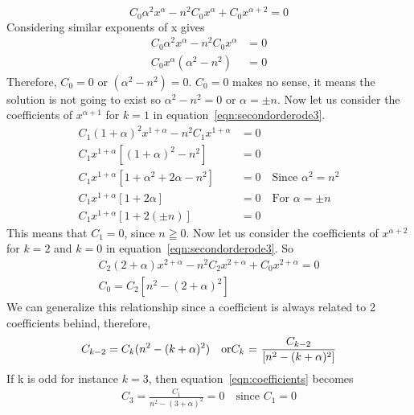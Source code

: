 \[
C_0 \alpha^2 x^\alpha - n^2C_0 x^\alpha + C_0 x^{\alpha + 2} =0
\]
Considering similar exponents of x gives 
\begin{align*}
C_0 \alpha^2 x^\alpha - n^2C_0 x^\alpha &=0\\
C_0 x^\alpha(\alpha^2 -n^2) &=0
\end{align*}
Therefore, $C_0 =0$ or $(\alpha^2 -n^2) =0$. $C_0 =0$ makes no sense, it means the solution is not going to exist so  $\alpha^2 -n^2 =0$ or  $\alpha =\pm n$. Now let us consider the coefficients of $x^{\alpha + 1}$ for $k=1$ in equation~\eqref{eqn:secondorderode3}.
\begin{align*}
C_1(1 + \alpha)^2 x^{1 + \alpha} - n^2 C_1 x^{1 + \alpha} &= 0\\
C_1x^{1 + \alpha}[(1 + \alpha)^2 - n^2] &= 0\\
C_1x^{1 + \alpha}[1 + \alpha^2 + 2\alpha - n^2] &=0\quad\text{Since }\alpha^2 = n^2\\
C_1x^{1 + \alpha}[1 + 2\alpha] &=0\quad\text{For }\alpha =\pm n\\
C_1x^{1 + \alpha}[1 + 2(\pm n)] &= 0
\end{align*}
This means that $C_1 = 0$, since $n \geqq 0$. Now let us consider the coefficients of $x^{\alpha + 2}$ for $k=2$ and $k=0$ in equation~\eqref{eqn:secondorderode3}.
So 
\begin{align*}
C_2(2 + \alpha) x^{2 + \alpha} - n^2 C_2x^{2 + \alpha} + C_0x^{2 + \alpha} = 0\\
C_0 = C_2[n^2 - (2 + \alpha)^2]
\end{align*}
We can generalize this relationship since a coefficient is always related to 2 coefficients behind, therefore,
\begin{dmath}
C_{k-2} = C_k (n^2 - (k + \alpha)^2)\quad\text{or}\\
C_k\text{ = }\frac{C_{k-2}}{[n^2 - (k + \alpha)^2]}
\label{eqn:coefficients}
\end{dmath}
If k is odd for instance $k = 3$, then equation~\eqref{eqn:coefficients} becomes
\begin{align*}
C_3 = \frac{C_{1}}{n^2 - (3 + \alpha)^2} = 0\quad\text{since }C_1 = 0
\end{align*} 

